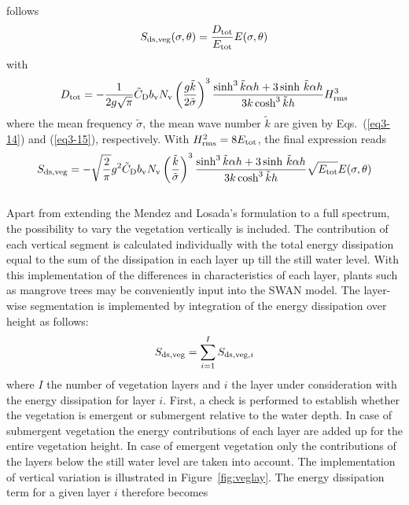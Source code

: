\documentclass[12pt]{book}
\begin{document}
follows
\begin{equation}
  S_{\rm ds,veg} (\sigma,\theta) = \frac{D_{\rm tot}}{E_{\rm tot}} E(\sigma,\theta)
\end{equation}
with
\begin{equation}
  D_{\rm tot} = -\frac{1}{2g\sqrt{\pi}} {\tilde C}_{\rm D} b_{\rm v} N_{\rm v} \left( \frac{g{\tilde{k}}}{2{\tilde{\sigma}}} \right)^3
                   \frac{\sinh^3 {\tilde{k}}\alpha h + 3\sinh\, {\tilde{k}}\alpha h}{3k\cosh^3 {\tilde{k}}h} H_{\rm rms}^3
  \label{eq:mendez2}
\end{equation}
where the mean frequency $\tilde{\sigma}$, the mean wave number $\tilde{k}$ are given by Eqs.~(\ref{eq3-14}) and (\ref{eq3-15}), respectively.
With $H^2_{\rm rms} = 8E_{\rm tot}$, the final expression reads
\begin{equation}
  S_{\rm ds,veg} = -\sqrt{\frac{2}{\pi}} g^2 {\tilde C}_{\rm D} b_{\rm v} N_{\rm v} \left( \frac{{\tilde{k}}}{{\tilde{\sigma}}} \right)^3
                   \frac{\sinh^3 {\tilde{k}}\alpha h + 3\sinh\, {\tilde{k}}\alpha h}{3k\cosh^3 {\tilde{k}}h} \sqrt{E_{\rm tot}} E(\sigma,\theta)
\end{equation}
\\[2ex]
\noindent
Apart from extending the Mendez and Losada's formulation to a full
spectrum, the possibility to vary the vegetation vertically is included. The
contribution of each vertical segment is calculated individually with the total energy
dissipation equal to the sum of the dissipation in each layer up till the still water level.
With this implementation of the differences in characteristics of each layer, plants such
as mangrove trees may be conveniently input into the SWAN model. The layer-wise
segmentation is implemented by integration of the energy dissipation over
height as follows:
\begin{equation}
  S_{\rm ds,veg} = \sum_{i=1}^{I} S_{{\rm ds,veg},i}
\end{equation}
where $I$ the number of vegetation
layers and $i$ the layer under consideration with the energy dissipation for layer $i$.
First, a check is performed to establish whether the vegetation is emergent or submergent
relative to the water depth. In case of submergent vegetation the energy contributions of
each layer are added up for the entire vegetation height. In case of emergent vegetation
only the contributions of the layers below the still water level are taken into account.
The implementation of vertical variation is illustrated in Figure~\ref{fig:veglay}.
The energy dissipation term for a given layer $i$ therefore becomes
\end{document}

